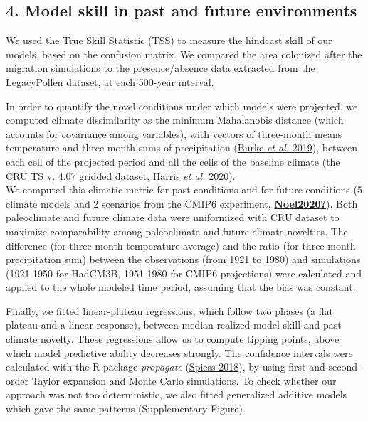 \documentclass[11pt,]{article}
\begin{document}
\hypertarget{model-skill-in-past-and-future-environments}{%
\subsection{4. Model skill in past and future
environments}\label{model-skill-in-past-and-future-environments}}

We used the True Skill Statistic (TSS) to measure the hindcast skill of
our models, based on the confusion matrix. We compared the area
colonized after the migration simulations to the presence/absence data
extracted from the LegacyPollen dataset, at each 500-year interval.

In order to quantify the novel conditions under which models were
projected, we computed climate dissimilarity as the minimum Mahalanobis
distance (which accounts for covariance among variables), with vectors
of three-month means temperature and three-month sums of precipitation
(\protect\hyperlink{ref-Burke2019}{Burke \emph{et al.} 2019}), between
each cell of the projected period and all the cells of the baseline
climate (the CRU TS v. 4.07 gridded dataset,
\protect\hyperlink{ref-Harris2020}{Harris \emph{et al.} 2020}).\\
We computed this climatic metric for past conditions and for future
conditions (5 climate models and 2 scenarios from the CMIP6 experiment,
\protect\hyperlink{ref-Noel2020}{\textbf{Noel2020?}}). Both paleoclimate
and future climate data were uniformized with CRU dataset to maximize
comparability among paleoclimate and future climate novelties. The
difference (for three-month temperature average) and the ratio (for
three-month precipitation sum) between the observations (from 1921 to
1980) and simulations (1921-1950 for HadCM3B, 1951-1980 for CMIP6
projections) were calculated and applied to the whole modeled time
period, assuming that the bias was constant.

Finally, we fitted linear-plateau regressions, which follow two phases
(a flat plateau and a linear response), between median realized model
skill and past climate novelty. These regressions allow us to compute
tipping points, above which model predictive ability decreases strongly.
The confidence intervals were calculated with the R package
\emph{propagate} (\protect\hyperlink{ref-Spiess2018}{Spiess 2018}), by
using first and second-order Taylor expansion and Monte Carlo
simulations. To check whether our approach was not too deterministic, we
also fitted generalized additive models which gave the same patterns
(Supplementary Figure).
\end{document}
